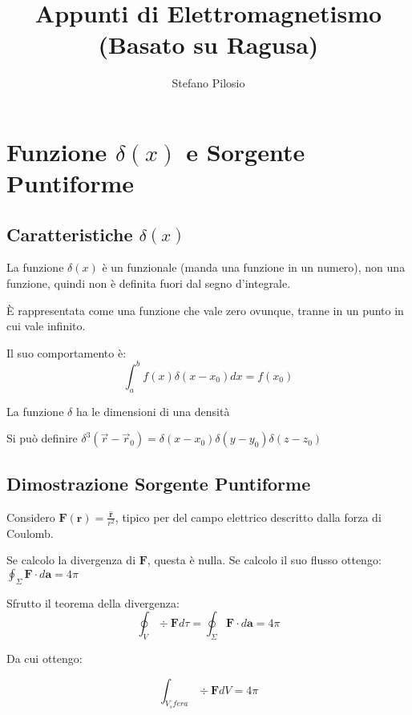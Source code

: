 \documentclass[a4paper]{scrarticle}
\begin{document}
\title{Appunti di Elettromagnetismo (Basato su Ragusa)}
\author{Stefano Pilosio}

\maketitle

\section{Funzione $\delta(x)$ e Sorgente Puntiforme}

\subsection{Caratteristiche $\delta(x)$}

La funzione $\delta(x)$ è un funzionale (manda una funzione in un numero), non una funzione, quindi non è definita fuori dal segno d'integrale.

È rappresentata come una funzione che vale zero ovunque, tranne in un punto in cui vale infinito.

Il suo comportamento è:
\begin{equation*}
    \int_{a}^{b} f(x) \delta (x-x_0) dx = f(x_0)
\end{equation*}

La funzione $\delta$ ha le dimensioni di una densità

Si può definire $\delta^3(\vec r - \vec r_0) = \delta(x-x_0)\delta(y-y_0)\delta(z-z_0)$

\subsection{Dimostrazione Sorgente Puntiforme}

Considero $\bm {F} (\bm r) = \frac{\hat {\bm{r}}}{r^2}$, tipico per del campo elettrico descritto dalla forza di Coulomb.

Se calcolo la divergenza di $\bm F$, questa è nulla.
Se calcolo il suo flusso ottengo: $\oint_{\Sigma} \bm {F} \cdot d \bm{a} = 4\pi$

Sfrutto il teorema della divergenza:
\begin{equation*}
    \oint_{V} \div{\bm{F}} d\tau = \oint_{\Sigma} \bm{F} \cdot d \bm{a} = 4\pi
\end{equation*}

Da cui ottengo:

\begin{equation*}
    \int_{V_sfera} \div {\bm F} dV = 4\pi
\end{equation*}
\end{document}
